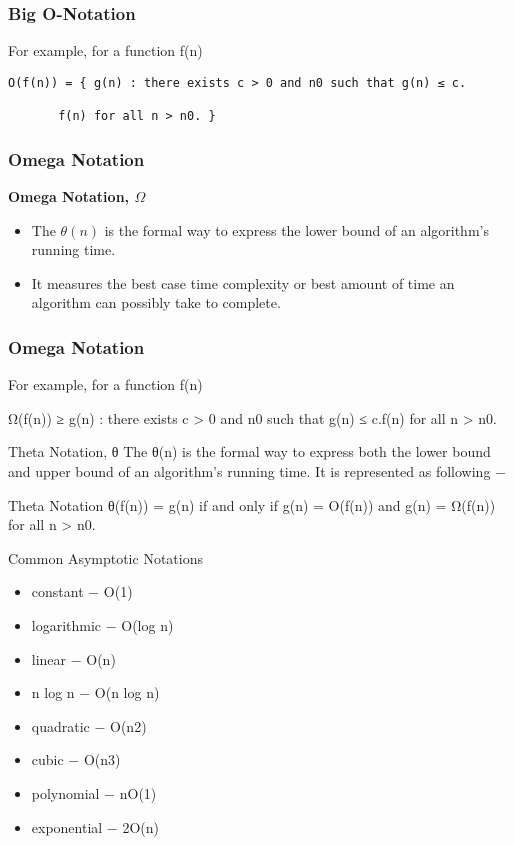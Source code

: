 \documentclass{beamer}
\begin{document}
\begin{frame}
\frametitle{Big O-Notation}
For example, for a function f(n)
\begin{verbatim}
Ο(f(n)) = { g(n) : there exists c > 0 and n0 such that g(n) ≤ c.

       f(n) for all n > n0. }
\end{verbatim}
\end{frame}
\begin{frame}
\frametitle{Omega Notation}
\large
\noindent \textbf{Omega Notation, $\Omega$}
\begin{itemize}
\item The $\theta (n)$ is the formal way to express the lower bound of an algorithm's running time. 
\item It measures the best case time complexity or best amount of time an algorithm can possibly take to complete.
\end{itemize}
\end{frame}
\begin{frame}
\frametitle{Omega Notation}
\large
For example, for a function f(n)

Ω(f(n)) ≥ { g(n) : there exists c > 0 and n0 such that g(n) ≤ c.f(n) for all n > n0. }

Theta Notation, θ
The θ(n) is the formal way to express both the lower bound and upper bound of an algorithm's running time. It is represented as following −
\end{frame}
\begin{frame}
Theta Notation
θ(f(n)) = { g(n) if and only if g(n) =  Ο(f(n)) and g(n) = Ω(f(n)) for all n > n0. }
\end{frame}
\begin{frame}
Common Asymptotic Notations
\begin{itemize}
\item constant	−	Ο(1)
\item logarithmic	−	Ο(log n)
\item linear	−	Ο(n)
\item n log n	−	Ο(n log n)
\item quadratic	−	Ο(n2)
\item cubic	−	Ο(n3)
\item polynomial	−	nΟ(1)
\item exponential	−	2Ο(n)
\end{itemize}
\end{frame}
\end{document}
